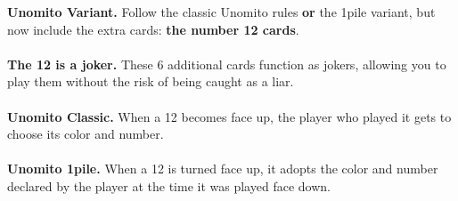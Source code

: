 \documentclass[a4paper]{memoir}
\begin{document}
{\footnotesize

\noindent
\textbf{ Unomito Variant.} Follow the classic Unomito rules \textbf{or} the 1pile variant, but now include the extra cards: \textbf{the number 12 cards}.
\\
\\
\noindent
\textbf{ The 12 is a joker.} These 6 additional cards function as jokers, allowing you to play them without the risk of being caught as a liar.
\\
\\
\noindent
\textbf{ Unomito Classic.} When a 12 becomes face up, the player who played it gets to choose its color and number.
\\
\\
\noindent
\textbf{ Unomito 1pile.} When a 12 is turned face up, it adopts the color and number declared by the player at the time it was played face down.
}
\end{document}
